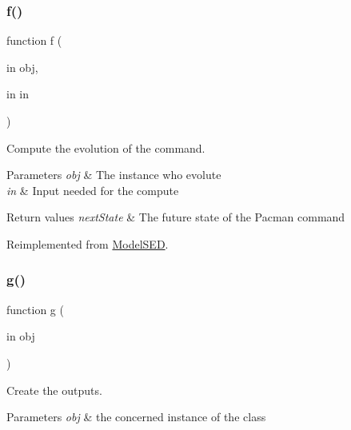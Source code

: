 \subsubsection{\texorpdfstring{f()}{f()}}
{\footnotesize\ttfamily function f (\begin{DoxyParamCaption}\item[{in}]{obj,  }\item[{in}]{in }\end{DoxyParamCaption})\hspace{0.3cm}{\ttfamily [virtual]}}



Compute the evolution of the command. 


\begin{DoxyParams}{Parameters}
{\em obj} & The instance who evolute \\
\hline
{\em in} & Input needed for the compute \\
\hline
\end{DoxyParams}

\begin{DoxyRetVals}{Return values}
{\em next\+State} & The future state of the Pacman command \\
\hline
\end{DoxyRetVals}


Reimplemented from \hyperlink{class_model_s_e_d_ac36f9451c43b120828af4380858f2024}{Model\+S\+ED}.

\mbox{\label{class_model_pacman_a07dadfabe92bf9a144b8a862720e7746}} 
\subsubsection{\texorpdfstring{g()}{g()}}
{\footnotesize\ttfamily function g (\begin{DoxyParamCaption}\item[{in}]{obj }\end{DoxyParamCaption})\hspace{0.3cm}{\ttfamily [virtual]}}



Create the outputs. 


\begin{DoxyParams}{Parameters}
{\em obj} & the concerned instance of the class \\
\hline
\end{DoxyParams}

